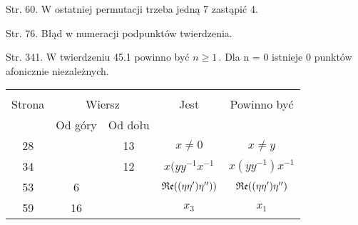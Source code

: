 \documentclass[a4paper,11pt]{article}
\begin{document}
\vspace{\spaceFour}



Str. 60. W ostatniej permutacji trzeba jedną 7 zastąpić 4.

\vspace{\spaceFour}



Str. 76. Błąd w numeracji podpunktów twierdzenia.

\vspace{\spaceFour}



Str. 341. W twierdzeniu 45.1 powinno być $n \geq 1 \, .$ Dla n = 0
istnieje 0 punktów afonicznie niezależnych.







\begin{center}

  \begin{tabular}{|c|c|c|c|c|}
    \hline
    & \multicolumn{2}{c|}{} & & \\
    Strona & \multicolumn{2}{c|}{Wiersz} & Jest
                              & Powinno być \\ \cline{2-3}
    & Od góry & Od dołu & & \\
    \hline
    28  & & 13 & $x \neq 0$ & $x \neq y$ \\
    34  & & 12 & $x( y y^{ -1 } x^{ -1 }$ & $x( y y^{ -1 } ) x^{ -1 }$ \\
    53  &  6 & & $\operatorname{\mathfrak{Re}}( ( \eta \eta' ) \eta'' ) )$
           & $\operatorname{\mathfrak{Re}}( ( \eta \eta' ) \eta'' )$ \\
    59  & 16 & & $x_{ 3 }$ & $x_{ 1 }$ \\
    \hline
  \end{tabular}

\end{center}
\end{document}
